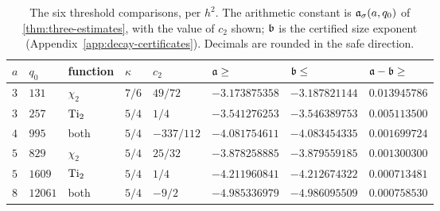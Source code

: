 \begin{table}[ht]
\centering
\caption{The six threshold comparisons, per $h^2$. The arithmetic constant is
$\mathfrak{a}_\sigma(a,q_0)$ of \cref{thm:three-estimates}, with the value of $c_2$ shown; $\mathfrak{b}$ is
the certified size exponent (Appendix~\ref{app:decay-certificates}). Decimals are rounded in the
safe direction.}
\label{tab:constants}
\small
\begin{tabular}{@{}llllllll@{}}
\toprule
$a$ & $q_0$ & function & $\kappa$ & $c_2$ & $\mathfrak{a}\ge$ & $\mathfrak{b}\le$ & $\mathfrak{a}-\mathfrak{b}\ge$\\
\midrule
$3$ & $131$ & $\chi_2$ & $7/6$ & $49/72$ & $-3.173875358$ & $-3.187821144$ & $0.013945786$\\
$3$ & $257$ & $\operatorname{Ti}_2$ & $5/4$ & $1/4$ & $-3.541276253$ & $-3.546389753$ & $0.005113500$\\
$4$ & $995$ & both & $5/4$ & $-337/112$ & $-4.081754611$ & $-4.083454335$ & $0.001699724$\\
$5$ & $829$ & $\chi_2$ & $5/4$ & $25/32$ & $-3.878258885$ & $-3.879559185$ & $0.001300300$\\
$5$ & $1609$ & $\operatorname{Ti}_2$ & $5/4$ & $1/4$ & $-4.211960841$ & $-4.212674322$ & $0.000713481$\\
$8$ & $12061$ & both & $5/4$ & $-9/2$ & $-4.985336979$ & $-4.986095509$ & $0.000758530$\\
\bottomrule
\end{tabular}
\end{table}

